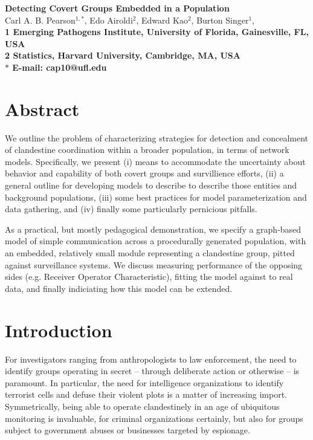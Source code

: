 \documentclass{article}
\newcommand{\todoCP}[1]{\todo{CP, #1}}
\begin{document}

\begin{flushleft}
{\Large
\textbf{Detecting Covert Groups Embedded in a Population}
}
\\
Carl A. B. Pearson$^{1,\ast}$, 
Edo Airoldi$^{2}$, 
Edward Kao$^{2}$,
Burton Singer$^{1}$, 
\\
\bf{1} Emerging Pathogens Institute, University of Florida, Gainesville, FL, USA
\\
\bf{2} Statistics, Harvard University, Cambridge, MA, USA
\\
$\ast$ E-mail: cap10@ufl.edu
\end{flushleft}
\section*{Abstract}
We outline the problem of characterizing strategies for detection and concealment of clandestine coordination within a broader population, in terms of network models.  Specifically, we present (i) means to accommodate the uncertainty about behavior and capability of both covert groups and survillience efforts, (ii) a general outline for developing models to describe to describe those entities and background populations, (iii) some best practices for model parameterization and data gathering, and (iv) finally some particularly pernicious pitfalls.

As a practical, but mostly pedagogical demonstration, we specify a graph-based model of simple communication across a procedurally generated population, with an embedded, relatively small module representing a clandestine group, pitted against surveillance systems.  We discuss measuring performance of the opposing sides (e.g. Receiver Operator Characteristic), fitting the model against to real data, and finally indiciating how this model can be extended.


\newpage

\section*{Introduction}
For investigators ranging from anthropologists to law enforcement, the need to identify groups operating in secret -- through deliberate action or otherwise -- is paramount.  In particular, the need for intelligence organizations to identify terrorist cells and defuse their violent plots is a matter of increasing import.  Symmetrically, being able to operate clandestinely in an age of ubiquitous monitoring is invaluable, for criminal organizations certainly, but also for groups subject to government abuses or businesses targeted by espionage.
\end{document}
